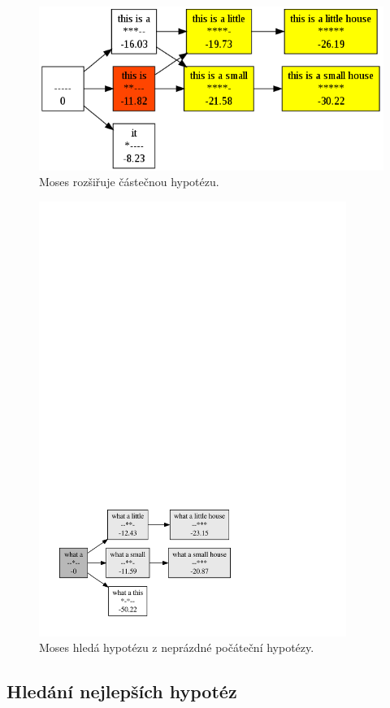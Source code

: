 \documentclass[12pt,a4paper]{report}
\begin{document}
\begin{figure}[t]
\centerline{\mbox{\includegraphics[width=120mm]{pictures/lattice-selected}}}
\caption{Moses rozšiřuje částečnou hypotézu.}
\label{lattice-selected}
\end{figure}

\begin{figure}[t]
\centerline{\mbox{\includegraphics[width=100mm]{pictures/non-zero-start}}}
\caption{Moses hledá hypotézu z neprázdné počáteční hypotézy.}
\label{non-zero-start}
\end{figure}

\subsection{Hledání nejlepších hypotéz}
\end{document}
